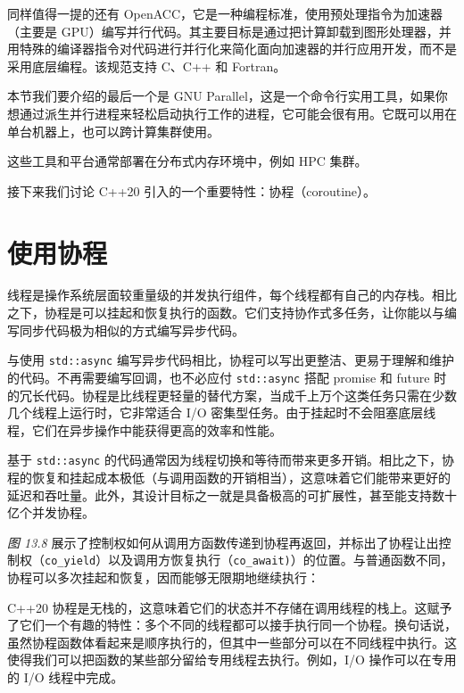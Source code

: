 同样值得一提的还有 OpenACC，它是一种编程标准，使用预处理指令为加速器（主要是 GPU）编写并行代码。其主要目标是通过把计算卸载到图形处理器，并用特殊的编译器指令对代码进行并行化来简化面向加速器的并行应用开发，而不是采用底层编程。该规范支持 C、C++ 和 Fortran。

本节我们要介绍的最后一个是 GNU Parallel，这是一个命令行实用工具，如果你想通过派生并行进程来轻松启动执行工作的进程，它可能会很有用。它既可以用在单台机器上，也可以跨计算集群使用。

这些工具和平台通常部署在分布式内存环境中，例如 HPC 集群。

接下来我们讨论 C++20 引入的一个重要特性：协程（coroutine）。

\section{使用协程}

\label{idx:1257}
线程是操作系统层面较重量级的并发执行组件，每个线程都有自己的内存栈。相比之下，协程是可以挂起和恢复执行的函数。它们支持协作式多任务，让你能以与编写同步代码极为相似的方式编写异步代码。

与使用 \texttt{std::\allowbreak{}async} 编写异步代码相比，协程可以写出更整洁、更易于理解和维护的代码。不再需要编写回调，也不必应付 \texttt{std::\allowbreak{}async} 搭配 promise 和 future 时的冗长代码。协程是比线程更轻量的替代方案，当成千上万个这类任务只需在少数几个线程上运行时，它非常适合 I/O 密集型任务。由于挂起时不会阻塞底层线程，它们在异步操作中能获得更高的效率和性能。

基于 \texttt{std::\allowbreak{}async} 的代码通常因为线程切换和等待而带来更多开销。相比之下，协程的恢复和挂起成本极低（与调用函数的开销相当），这意味着它们能带来更好的延迟和吞吐量。此外，其设计目标之一就是具备极高的可扩展性，甚至能支持数十亿个并发协程。

\label{idx:1258}
\emph{图 13.8} 展示了控制权如何从调用方函数传递到协程再返回，并标出了协程让出控制权（\texttt{co\_yield}）以及调用方恢复执行（\texttt{co\_\allowbreak{}await)\allowbreak{}}）的位置。与普通函数不同，协程可以多次挂起和恢复，因而能够无限期地继续执行：


C++20 协程是无栈的，这意味着它们的状态并不存储在调用线程的栈上。这赋予了它们一个有趣的特性：多个不同的线程都可以接手执行同一个协程。换句话说，虽然协程函数体看起来是顺序执行的，但其中一些部分可以在不同线程中执行。这使得我们可以把函数的某些部分留给专用线程去执行。例如，I/O 操作可以在专用的 I/O 线程中完成。

